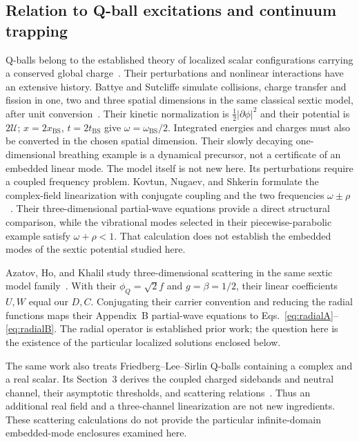 \subsection{Relation to Q-ball excitations and continuum trapping}
\label{sec:related-work}

Q-balls belong to the established theory of localized scalar configurations
carrying a conserved global charge~\cite{Coleman1985}. Their perturbations
and nonlinear interactions have an extensive history. Battye and Sutcliffe
simulate collisions, charge transfer and fission in one, two and three
spatial dimensions in the same classical sextic model, after unit
conversion~\cite{BattyeSutcliffe2000}. Their kinetic normalization is
$\tfrac12|\partial\phi|^2$ and their potential is $2\mathcal U$;
$x=2x_{\mathrm{BS}}$, $t=2t_{\mathrm{BS}}$ give $\omega=\omega_{\mathrm{BS}}/2$.
Integrated energies and charges must also be converted in the chosen
spatial dimension. Their slowly decaying one-dimensional breathing
example is a dynamical precursor, not a certificate of an embedded linear
mode. The model itself is not new here. Its perturbations
require a coupled frequency problem. Kovtun, Nugaev, and Shkerin formulate
the complex-field linearization with conjugate coupling and the two
frequencies $\omega\pm\rho$~\cite{Kovtun2018}. Their three-dimensional
partial-wave equations provide a direct structural comparison, while the
vibrational modes selected in their piecewise-parabolic example satisfy
$\omega+\rho<1$. That calculation does not establish the embedded modes
of the sextic potential studied here.

Azatov, Ho, and Khalil study three-dimensional scattering in the same
sextic model family~\cite{Azatov2024}. With their $\phi_Q=\sqrt2 f$ and
$g=\beta=1/2$, their linear coefficients $U,W$ equal our $D,C$.
Conjugating their carrier convention and reducing the radial functions
maps their Appendix~B partial-wave equations to
Eqs.~\eqref{eq:radialA}--\eqref{eq:radialB}.
The radial operator is established prior work; the question here is the
existence of the particular localized solutions enclosed below.

The same work also treats Friedberg--Lee--Sirlin Q-balls containing a
complex and a real scalar. Its Section~3 derives the coupled charged
sidebands and neutral channel, their asymptotic thresholds, and scattering
relations~\cite{Azatov2024}. Thus an additional real field and a
three-channel linearization are not new ingredients. These scattering
calculations do not provide the particular infinite-domain embedded-mode
enclosures examined here.

